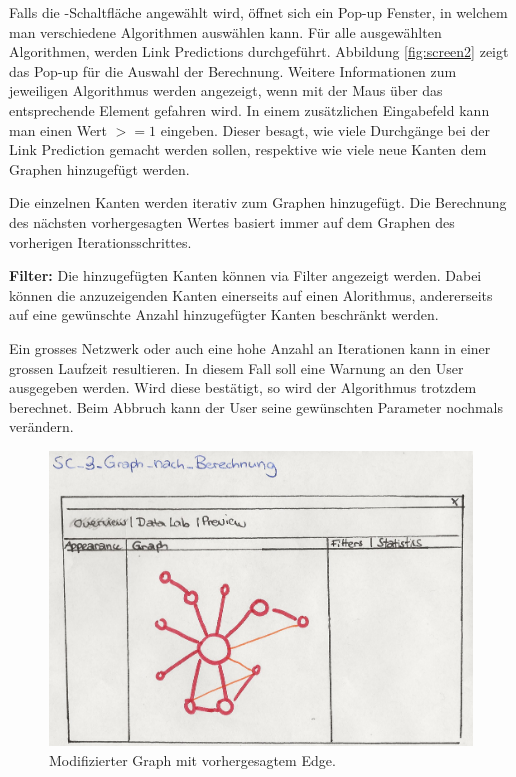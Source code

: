 Falls die -Schaltfläche angewählt wird, öffnet sich ein Pop-up Fenster, in welchem man verschiedene Algorithmen auswählen
kann. Für alle ausgewählten Algorithmen, werden Link Predictions durchgeführt. Abbildung \ref{fig:screen2} zeigt das Pop-up für die Auswahl der Berechnung. Weitere Informationen zum jeweiligen Algorithmus werden angezeigt, wenn mit der Maus über das entsprechende Element gefahren wird. In einem zusätzlichen Eingabefeld kann man einen Wert
$>= 1$ eingeben. Dieser besagt, wie viele Durchgänge bei der Link Prediction gemacht werden sollen, respektive wie viele
neue Kanten dem Graphen hinzugefügt werden.

Die einzelnen Kanten werden iterativ zum Graphen hinzugefügt. Die Berechnung des nächsten vorhergesagten Wertes basiert immer auf dem Graphen des vorherigen Iterationsschrittes.

\item \textbf{Filter:} Die hinzugefügten Kanten können via Filter angezeigt werden. Dabei können die anzuzeigenden Kanten einerseits auf einen Alorithmus, andererseits auf eine gewünschte Anzahl hinzugefügter Kanten beschränkt werden.


Ein grosses Netzwerk oder auch eine hohe Anzahl an Iterationen kann in einer grossen Laufzeit resultieren.
In diesem Fall soll eine Warnung an den User ausgegeben
werden. Wird diese bestätigt, so wird der Algorithmus trotzdem berechnet. Beim Abbruch kann der User seine gewünschten
Parameter nochmals verändern.

\begin{figure}
    \includegraphics[width=\linewidth]{resources/SC-3.png}
    \caption{Modifizierter Graph mit vorhergesagtem Edge.}
    \label{fig:screen3}
\end{figure}

